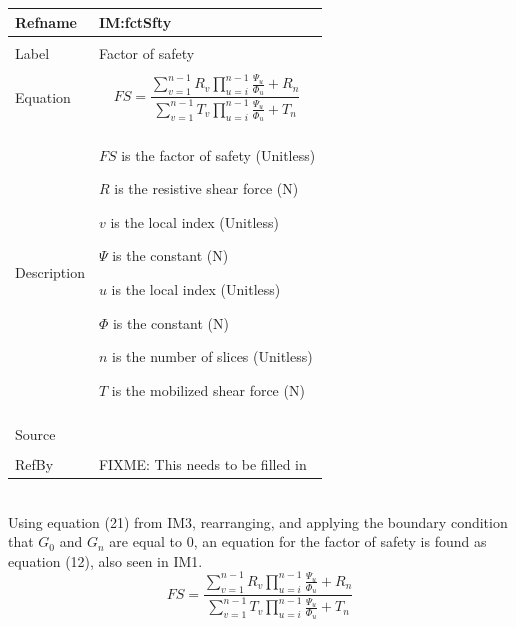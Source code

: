 \documentclass[12pt]{article}
\begin{document}
\noindent \begin{minipage}{\textwidth}
\begin{tabular}{p{} p{}}
\toprule \textbf{Refname} & \textbf{IM:fctSfty}
\label{IM:fctSfty}
\\ \midrule \\
Label & Factor of safety
\\ \midrule \\
Equation & \begin{dmath}
           FS=\frac{\displaystyle\sum_{v=1}^{n-1}{R_{v} \displaystyle\prod_{u=i}^{n-1}{\frac{Ψ_{u}}{Φ_{u}}}}+R_{n}}{\displaystyle\sum_{v=1}^{n-1}{T_{v} \displaystyle\prod_{u=i}^{n-1}{\frac{Ψ_{u}}{Φ_{u}}}}+T_{n}}
           \end{dmath}
\\ \midrule \\
Description & \begin{symbDescription}
              \item{$FS$ is the factor of safety (Unitless)}
              \item{$R$ is the resistive shear force (N)}
              \item{$v$ is the local index (Unitless)}
              \item{$Ψ$ is the constant (N)}
              \item{$u$ is the local index (Unitless)}
              \item{$Φ$ is the constant (N)}
              \item{$n$ is the number of slices (Unitless)}
              \item{$T$ is the mobilized shear force (N)}
              \end{symbDescription}
\\ \midrule \\
Source &
\\ \midrule \\
RefBy & FIXME: This needs to be filled in
\\ \bottomrule \end{tabular}
\end{minipage}\\
Using equation (21) from IM3, rearranging, and applying the boundary condition that $G_{0}$ and $G_{n}$ are equal to $0$, an equation for the factor of safety is found as equation (12), also seen in IM1.
\begin{dmath}
FS=\frac{\displaystyle\sum_{v=1}^{n-1}{R_{v} \displaystyle\prod_{u=i}^{n-1}{\frac{Ψ_{u}}{Φ_{u}}}}+R_{n}}{\displaystyle\sum_{v=1}^{n-1}{T_{v} \displaystyle\prod_{u=i}^{n-1}{\frac{Ψ_{u}}{Φ_{u}}}}+T_{n}}
\end{dmath}
\end{document}

